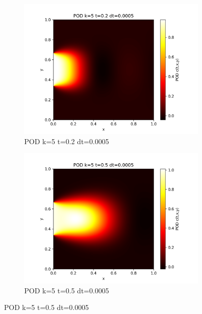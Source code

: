 \documentclass[11pt,a4 paper,one side]{article}
\begin{document}
\begin{figure}[htbp]
    \centering
    \begin{subfigure}{0.45\textwidth}
        \includegraphics[width=\textwidth]{POD k=5 t=0.2 dt=0.0005.png}
        \caption{POD k=5 t=0.2 dt=0.0005}
        \label{POD k=5 t=0.2 dt=0.0005}
    \end{subfigure}
    \hfill
    \begin{subfigure}{0.45\textwidth}
        \includegraphics[width=\textwidth]{POD k=5 t=0.5 dt=0.0005.png}
        \caption{POD k=5 t=0.5 dt=0.0005}
        \label{POD k=5 t=0.5 dt=0.0005}
    \end{subfigure}
    
    \vspace{0.5cm}  %
    

\end{figure}
\end{document}
